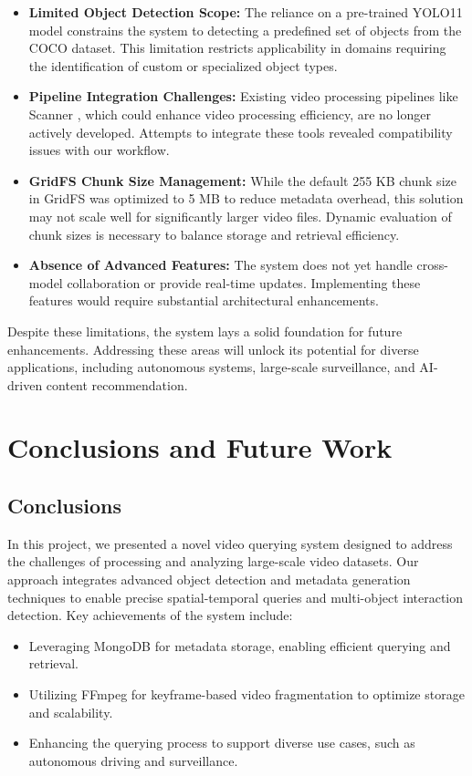 \documentclass[conference]{IEEEtran}
\begin{document}
\begin{itemize}
    \item \textbf{Limited Object Detection Scope:} The reliance on a pre-trained YOLO11 model constrains the system to detecting a predefined set of objects from the COCO dataset. This limitation restricts applicability in domains requiring the identification of custom or specialized object types.
    \item \textbf{Pipeline Integration Challenges:} Existing video processing pipelines like Scanner \cite{poms2018scanner}, which could enhance video processing efficiency, are no longer actively developed. Attempts to integrate these tools revealed compatibility issues with our workflow.
    \item \textbf{GridFS Chunk Size Management:} While the default 255 KB chunk size in GridFS was optimized to 5 MB to reduce metadata overhead, this solution may not scale well for significantly larger video files. Dynamic evaluation of chunk sizes is necessary to balance storage and retrieval efficiency.
    \item \textbf{Absence of Advanced Features:} The system does not yet handle cross-model collaboration or provide real-time updates. Implementing these features would require substantial architectural enhancements.
\end{itemize}

Despite these limitations, the system lays a solid foundation for future enhancements. Addressing these areas will unlock its potential for diverse applications, including autonomous systems, large-scale surveillance, and AI-driven content recommendation.

\label{sec:limitations-sub}








\section{Conclusions and Future Work}
\label{sec:conclusions}
\subsection{Conclusions}
In this project, we presented a novel video querying system designed to address the challenges of processing and analyzing large-scale video datasets. Our approach integrates advanced object detection and metadata generation techniques to enable precise spatial-temporal queries and multi-object interaction detection.
Key achievements of the system include:
\begin{itemize}
    \item Leveraging MongoDB for metadata storage, enabling efficient querying and retrieval.
    \item Utilizing FFmpeg for keyframe-based video fragmentation to optimize storage and scalability.
    \item Enhancing the querying process to support diverse use cases, such as autonomous driving and surveillance.
\end{itemize}
\end{document}
